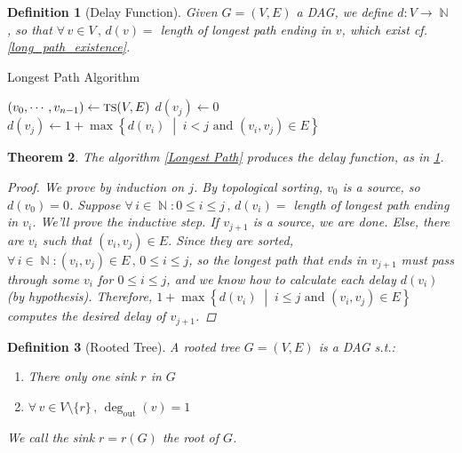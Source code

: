 \documentclass[12pt]{article}
\newcommand{\set}[2]{\left\{{#1}\;\middle|\;{#2}\right\}}
\newcommand{\Forall}[1]{\forall\,{#1}\,,\,}
\newcommand{\scrf}[1]{{\scriptstyle\textup{\footnotesize #1}}}
\DeclareMathOperator{\N}{\mathbb{N}}
\newcommand{\sm}[1]{\setminus\{#1\}}
\newcommand*{\degout}{\deg_{\text{out}}}
\newtheorem{theorem}{Theorem}[subsection]
\newtheorem{definition}[theorem]{Definition}
\begin{document}
\begin{definition}[Delay Function]
  \label{def_delay}
  Given $G=(V,E)$ a DAG, we define $d:V\to\N$, so that $\Forall{v\in V} d(v)=$ \emph{length of longest path ending in $v$}, which exist cf. \ref{long_path_existence}.
\end{definition}

\begin{algorithm}[H]
  \caption{Longest Path Algorithm}
  \begin{algorithmic}
    \State $(v_0,\cdots,v_{n-1})\gets \scrf{TS}(V,E)$
        \State $d(v_j)\gets 0$
      \Else
        \State $d(v_j)\gets 1+\max\set{d(v_i)}{i<j\text{ and }(v_i,v_j)\in E}$
      \EndIf
    \EndFor
  \end{algorithmic}
  \label{Longest Path}
\end{algorithm}

\begin{theorem}
  The algorithm \ref{Longest Path} produces the delay function, as in \ref{def_delay}.
  \begin{proof}
    We prove by induction on $j$. By topological sorting, $v_0$ is a source, so $d(v_0)=0$. Suppose $\Forall{i\in\N:0 \leq i\leq j} d(v_i)=$ length of longest path ending in $v_i$. We'll prove the inductive step. If $v_{j+1}$ is a source, we are done. Else, there are $v_i$ such that $(v_i,v_j)\in E$. Since they are sorted, $\Forall{i\in\N:(v_i,v_j)\in E} 0\leq i\leq j$, so the longest path that ends in $v_{j+1}$ must pass through some $v_i$ for $0\leq i\leq j$, and we know how to calculate each delay $d(v_i)$ (by hypothesis). Therefore, $1+\max\set{d(v_i)}{i\leq j\text{ and }(v_i,v_j)\in E}$ computes the desired delay of $v_{j+1}$.
  \end{proof}
\end{theorem}

\begin{definition}[Rooted Tree]
  \label{def_rooted}
  A rooted tree $G=(V,E)$ is a DAG s.t.:
  \begin{enumerate}
    \item There only one sink $r$ in $G$
    \item $\Forall{v\in V\sm{r}} \degout(v)=1$
  \end{enumerate}
  We call the sink $r=r(G)$ the root of $G$.
\end{definition}
\end{document}
